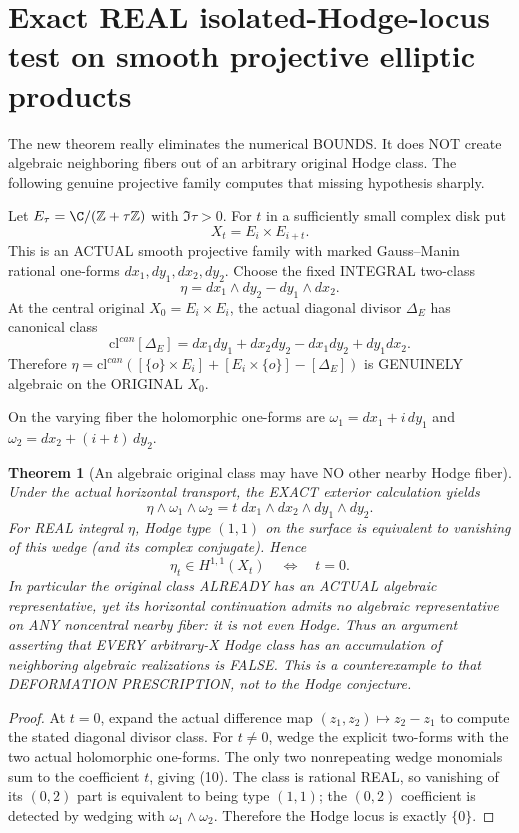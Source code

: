 \documentclass[11pt]{article}
\newcommand{\cl}{\mathrm{cl}}
\newtheorem{theorem}{Theorem}
\begin{document}
\section{Exact REAL isolated-Hodge-locus test on smooth projective elliptic products}
The new theorem really eliminates the numerical BOUNDS.
It does NOT create algebraic neighboring fibers out of
an arbitrary original Hodge class. The following genuine
projective family computes that missing hypothesis sharply.

Let \(E_\tau=\C/(\mathbb Z+\tau\mathbb Z)\)
with \(\Im\tau>0\). For \(t\) in a sufficiently
small complex disk put
\[
 X_t=E_i\times E_{i+t}.
\]
This is an ACTUAL smooth projective family with marked
Gauss--Manin rational one-forms \(dx_1,dy_1,dx_2,dy_2\).
Choose the fixed INTEGRAL two-class
\[
 \boxed{\eta=dx_1\wedge dy_2-dy_1\wedge dx_2.}    \tag{9}
\]
At the central original \(X_0=E_i\times E_i\),
the actual diagonal divisor \(\Delta_E\)
has canonical class
\[
 \cl^{can}[\Delta_E]
 =dx_1dy_1+dx_2dy_2-dx_1dy_2+dy_1dx_2.
\]
Therefore \(\eta=\cl^{can}([\{o\}\times E_i]
 +[E_i\times\{o\}]-[\Delta_E])\) is GENUINELY
algebraic on the ORIGINAL \(X_0\).

On the varying fiber the holomorphic one-forms are
\(\omega_1=dx_1+i\,dy_1\) and
\(\omega_2=dx_2+(i+t)\,dy_2\).
\begin{theorem}[An algebraic original class may have NO other nearby Hodge fiber]
Under the actual horizontal transport, the
EXACT exterior calculation yields
\[
 \boxed{\eta\wedge\omega_1\wedge\omega_2
    =t\;dx_1\wedge dx_2\wedge dy_1\wedge dy_2.}  \tag{10}
\]
For REAL integral \(\eta\), Hodge type \((1,1)\)
on the surface is equivalent to vanishing of this
wedge (and its complex conjugate). Hence
\[
 \boxed{\eta_t\in H^{1,1}(X_t)
                       \quad\Longleftrightarrow\quad t=0.}
                                                               \tag{11}
\]
In particular the original class ALREADY has an
ACTUAL algebraic representative, yet its horizontal
continuation admits no algebraic representative
on ANY noncentral nearby fiber: it is not even Hodge.
Thus an argument asserting that EVERY arbitrary-X
Hodge class has an accumulation of neighboring
algebraic realizations is FALSE.
This is a counterexample to that DEFORMATION
PRESCRIPTION, not to the Hodge conjecture.
\end{theorem}
\begin{proof}
At \(t=0\), expand the actual difference map
\((z_1,z_2)\mapsto z_2-z_1\) to compute
the stated diagonal divisor class.
For \(t\ne0\), wedge the explicit two-forms
with the two actual holomorphic one-forms.
The only two nonrepeating wedge monomials
sum to the coefficient \(t\), giving (10).
The class is rational REAL, so vanishing of its
\((0,2)\) part is equivalent to being type
\((1,1)\); the \((0,2)\) coefficient is detected
by wedging with \(\omega_1\wedge\omega_2\).
Therefore the Hodge locus is exactly \(\{0\}\).
\end{proof}
\end{document}
